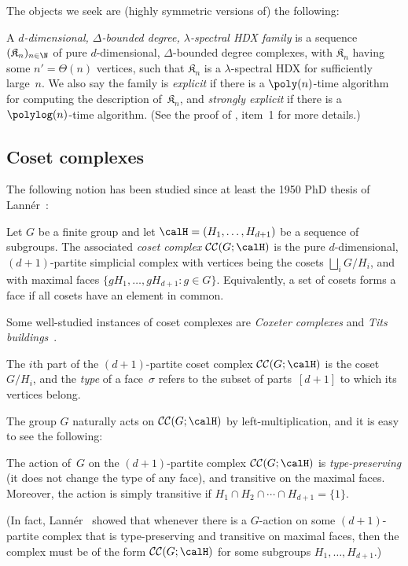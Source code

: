 \documentclass[11pt]{article}
\newcommand{\CC}[2]{\mathcal{C}\mathcal{C}(#1;#2)}
\newcommand{\complex}{\mathfrak{K}}
\begin{document}
The objects we seek are (highly symmetric versions of) the following:
\begin{definition}
    A \emph{$d$-dimensional, $\Delta$-bounded degree, $\lambda$-spectral HDX family} is a sequence $(\complex_n)_{n \in \N}$ of pure $d$-dimensional, $\Delta$-bounded degree complexes, with $\complex_n$ having some $n' = \Theta(n)$ vertices, such that $\complex_n$ is a $\lambda$-spectral HDX for sufficiently large~$n$.
    We also say the family is \emph{explicit} if there is a $\poly(n)$-time algorithm for computing the description of~$\complex_n$, and \emph{strongly explicit} if there is a $\polylog(n)$-time algorithm.  (See the proof of , item~1 for more details.)
\end{definition}

\subsection{Coset complexes}
The following notion has been studied since at least the 1950 PhD thesis of Lann\'{e}r~\cite{Lan50}:
\begin{definition}
    Let $G$ be a finite group and let $\calH = (H_1, \dots, H_{d+1})$ be a sequence of subgroups.
    The associated \emph{coset complex} $\CC{G}{\calH}$ is the pure $d$-dimensional, $(d+1)$-partite simplicial complex with vertices being the cosets $\bigsqcup_i G/H_i$, and with maximal faces $\{gH_1, \dots, gH_{d+1} : g \in G\}$.
    Equivalently, a set of cosets forms a face if all cosets have an element in common.
\end{definition}
Some well-studied instances of coset complexes are \emph{Coxeter complexes} and \emph{Tits buildings}~\cite{Bjo84}.
\begin{definition}                                        \label{fact:types}
    The $i$th part of the $(d+1)$-partite coset complex $\CC{G}{\calH}$ is the coset~$G/H_i$, and the \emph{type} of a face~$\sigma$ refers to the subset of parts~$[d+1]$ to which its vertices belong.
\end{definition}
The group $G$ naturally acts on $\CC{G}{\calH}$ by left-multiplication, and it is easy to see the following:
\begin{fact}                                        \label{fact:type-preserving}
    The action of~$G$ on the $(d+1)$-partite complex $\CC{G}{\calH}$ is \emph{type-preserving} (it does not change the type of any face), and transitive on the maximal faces.
    Moreover, the action is simply transitive if $H_1 \cap H_2 \cap \cdots \cap H_{d+1} = \{1\}$.
\end{fact}
\noindent (In fact, Lann\'{e}r~\cite{Lan50} showed that whenever there is a $G$-action on some $(d+1)$-partite complex that is type-preserving and transitive on maximal faces, then the complex must be of the form $\CC{G}{\calH}$ for some subgroups $H_1, \dots, H_{d+1}$.)
\end{document}
